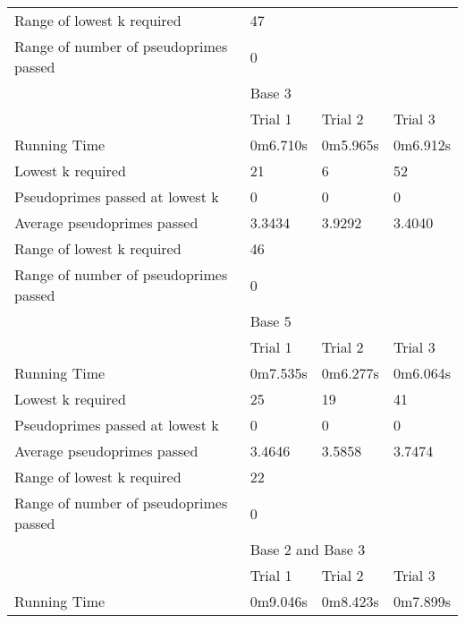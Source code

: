 \documentclass{article}
\begin{document}
\begin{appendices}
\begin{longtable}{llll}
\cmidrule(lr){2-4}
Range of lowest k required             & \multicolumn{3}{l}{47}                 \\
Range of number of pseudoprimes passed & \multicolumn{3}{l}{0}                  \\
\midrule
                                       & \multicolumn{3}{l}{Base 3}             \\
\midrule
                                       & Trial 1   & Trial 2  & Trial 3         \\
Running Time                           & 0m6.710s  & 0m5.965s & 0m6.912s        \\
Lowest k required                      & 21        & 6        & 52              \\
Pseudoprimes passed at lowest k        & 0         & 0        & 0               \\
Average pseudoprimes passed            & 3.3434    & 3.9292   & 3.4040          \\
\cmidrule(lr){2-4}
Range of lowest k required             & \multicolumn{3}{l}{46}                 \\
Range of number of pseudoprimes passed & \multicolumn{3}{l}{0}                  \\
\midrule
                                       & \multicolumn{3}{l}{Base 5}             \\
\midrule
                                       & Trial 1   & Trial 2  & Trial 3         \\
Running Time                           & 0m7.535s  & 0m6.277s & 0m6.064s        \\
Lowest k required                      & 25        & 19       & 41              \\
Pseudoprimes passed at lowest k        & 0         & 0        & 0               \\
Average pseudoprimes passed            & 3.4646    & 3.5858   & 3.7474          \\
\cmidrule(lr){2-4}
Range of lowest k required             & \multicolumn{3}{l}{22}                 \\
Range of number of pseudoprimes passed & \multicolumn{3}{l}{0}                  \\
\midrule
                                       & \multicolumn{3}{l}{Base 2 and Base 3}  \\
\midrule
                                       & Trial 1   & Trial 2  & Trial 3         \\
Running Time                           & 0m9.046s  & 0m8.423s & 0m7.899s        \\

\end{longtable}
\end{appendices}
\end{document}
